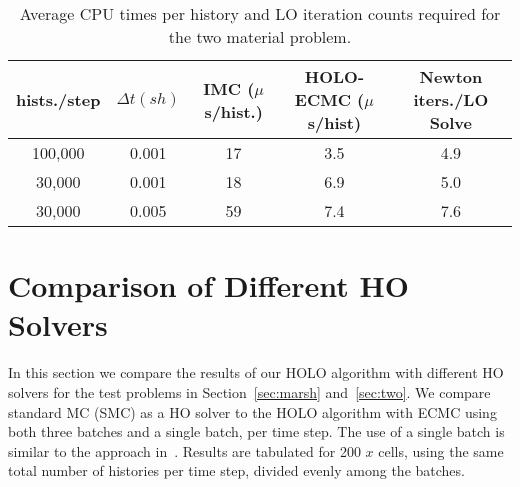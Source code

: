 \begin{table}[htb!]
\centering
\caption{\label{twomat_table} {Average CPU times per history and LO iteration
counts required for the two material problem.}}
	\begin{tabular}{|cc|c|cc|} \hline
hists./step & $\Delta t (sh)$ & IMC ($\mu$s/hist.) & HOLO-ECMC ($\mu$s/hist)  &
Newton iters./LO Solve\\ \hline
100,000          &   0.001	& 17  &	3.5   & 4.9 \\
30,000   &    0.001	& 18  &	6.9   &    5.0 \\
30,000    &   0.005	& 59  & 7.4   &    7.6 \\ \hline
\end{tabular}
\end{table}

\section{Comparison of Different HO Solvers}
\label{ho_solvers}

In this section we compare the results of our HOLO algorithm with different HO
solvers for the test problems in Section~\ref{sec:marsh} and~\ref{sec:two}.  We compare standard MC (SMC) as a HO solver to the HOLO algorithm with ECMC using
both three batches and a single batch, per time step.  The use of a single batch is
similar to the approach in~\cite{rmc}.  Results are tabulated for 200 $x$ cells, using the same total
number of histories per time step, divided evenly among the batches.

